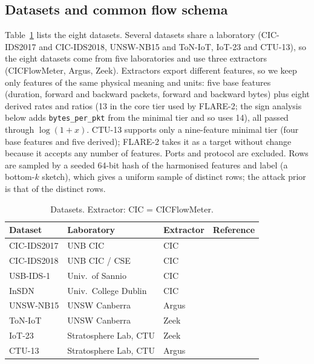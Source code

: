 \documentclass[11pt]{article}
\begin{document}
\subsection{Datasets and common flow schema}
Table~\ref{tab:data} lists the eight datasets.
Several datasets share a laboratory (CIC-IDS2017 and CIC-IDS2018, UNSW-NB15 and ToN-IoT, IoT-23 and CTU-13), so the eight datasets come from five laboratories and use three extractors (CICFlowMeter, Argus, Zeek).
Extractors export different features, so we keep only features of the same physical meaning and units: five base features (duration, forward and backward packets, forward and backward bytes) plus eight derived rates and ratios (13 in the core tier used by FLARE-2; the sign analysis below adds \texttt{bytes\_per\_pkt} from the minimal tier and so uses 14), all passed through $\log(1+x)$.
CTU-13 supports only a nine-feature minimal tier (four base features and five derived); FLARE-2 takes it as a target without change because it accepts any number of features.
Ports and protocol are excluded.
Rows are sampled by a seeded 64-bit hash of the harmonised features and label (a bottom-$k$ sketch), which gives a uniform sample of distinct rows; the attack prior is that of the distinct rows.

\begin{table}[t]
\centering\small
\caption{Datasets. Extractor: CIC = CICFlowMeter.}\label{tab:data}
\begin{tabular}{llll}
\toprule
Dataset & Laboratory & Extractor & Reference\\
\midrule
CIC-IDS2017 & UNB CIC & CIC & \citep{sharafaldin2018cicids}\\
CIC-IDS2018 & UNB CIC / CSE & CIC & \citep{sharafaldin2018cicids}\\
USB-IDS-1 & Univ.\ of Sannio & CIC & \citep{catillo2021usbids1}\\
InSDN & Univ.\ College Dublin & CIC & \citep{elsayed2020insdn}\\
UNSW-NB15 & UNSW Canberra & Argus & \citep{moustafa2015unsw}\\
ToN-IoT & UNSW Canberra & Zeek & \citep{alsaedi2020toniot}\\
IoT-23 & Stratosphere Lab, CTU & Zeek & \citep{garcia2020iot23}\\
CTU-13 & Stratosphere Lab, CTU & Argus & \citep{garcia2014ctu13}\\
\bottomrule
\end{tabular}
\end{table}
\end{document}

